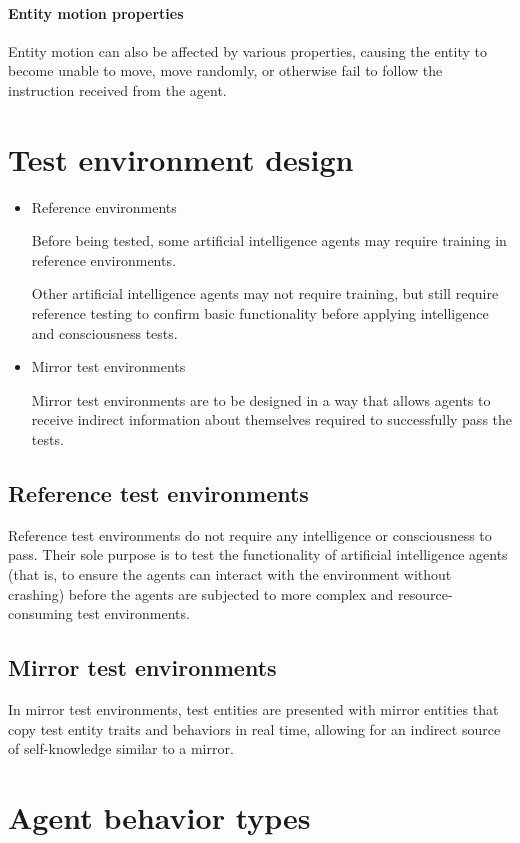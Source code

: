 \documentclass[masterthesis]{fer}
\begin{document}
\paragraph{Entity motion properties}

Entity motion can also be affected by various properties,
causing the entity to become unable to move, move randomly, or
otherwise fail to follow the instruction received from the agent.

\section{Test environment design}
\begin{itemize}

\item Reference environments

Before being tested, some artificial intelligence agents may require training in reference environments.

Other artificial intelligence agents may not require training, but still require reference testing to confirm basic functionality before applying intelligence and consciousness tests.

\item Mirror test environments

Mirror test environments are to be designed in a way that allows agents to receive indirect information about themselves required to successfully pass the tests.

\end{itemize}

\subsection{Reference test environments}
Reference test environments do not require any intelligence or consciousness to pass.
Their sole purpose is to test the functionality of artificial intelligence agents
(that is, to ensure the agents can interact with the environment without crashing)
before the agents are subjected to more complex and resource-consuming test environments.
\subsection{Mirror test environments}
In mirror test environments, test entities are presented with mirror entities that copy test entity traits and behaviors in real time, allowing for an indirect source of self-knowledge similar to a mirror.
\section{Agent behavior types}
\end{document}
